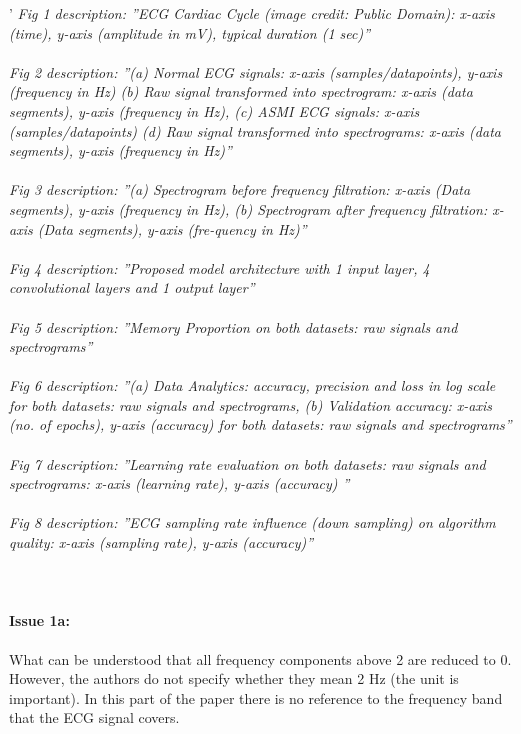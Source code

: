 \documentclass{article}
\begin{document}
'\textit{
Fig 1 description: ''ECG Cardiac Cycle (image credit: Public Domain): x-axis (time), y-axis (amplitude in mV),     typical duration (1 sec)''\\\\
Fig 2 description: ''(a) Normal ECG signals: x-axis (samples/datapoints), y-axis (frequency in Hz) (b) Raw signal transformed into spectrogram: x-axis (data segments), y-axis (frequency in Hz), (c) ASMI ECG signals: x-axis (samples/datapoints) (d) Raw signal transformed into spectrograms: x-axis (data segments), y-axis (frequency in Hz)''\\\\
Fig 3 description: ''(a) Spectrogram before frequency filtration: x-axis (Data segments), y-axis (frequency in Hz), (b) Spectrogram after frequency filtration: x-axis (Data segments), y-axis (fre-quency in Hz)''\\\\
Fig 4 description: ''Proposed model architecture with 1 input layer, 4 convolutional layers and 1 output layer''\\\\
Fig 5 description: ''Memory Proportion on both datasets: raw signals and spectrograms''\\\\
Fig 6 description: ''(a) Data Analytics: accuracy, precision and loss in log scale for both datasets: raw signals and spectrograms, (b) Validation accuracy: x-axis (no. of epochs), y-axis (accuracy) for both datasets: raw signals and spectrograms''\\\\
Fig 7 description: ''Learning rate evaluation on both datasets: raw signals and spectrograms: x-axis (learning rate), y-axis (accuracy) ''\\\\
Fig 8 description: ''ECG sampling rate influence (down sampling) on algorithm quality: x-axis (sampling rate), y-axis (accuracy)''\\\\\\
}



\paragraph{Issue 1a:}
\begin{displayquote}
What can be understood that all frequency components above 2 are reduced to 0. However, the authors do not specify whether they mean 2 Hz (the unit is important). In this part of the paper there is no reference to the frequency band that the ECG signal covers.
\end{displayquote}
\end{document}
